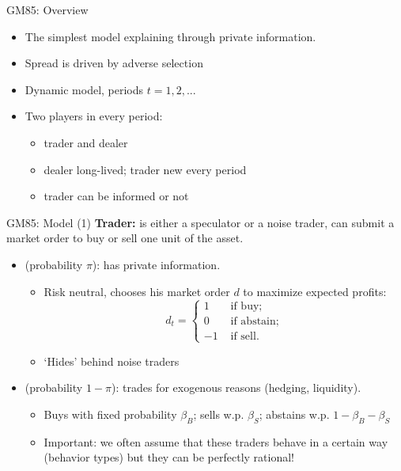 \documentclass[english,10pt
,aspectratio=169
]{beamer}
\begin{document}
\begin{frame}{GM85: Overview}
	\begin{itemize}
		\item The simplest model explaining  through private information.
		\item Spread is driven by adverse selection
		\item Dynamic model, periods $t = 1,2,...$
		\item Two players in every period:
		\begin{itemize}
			\item trader and dealer
			\item dealer long-lived; trader new every period
			\item trader can be informed or not
		\end{itemize}
	\end{itemize}
\end{frame}



\begin{frame}{GM85: Model (1)}
	\textbf{Trader:} is either a speculator or a noise trader, can submit a market order to buy or sell one unit of the asset.
	\begin{itemize}
		\item {} (probability $\pi$): has private information.
		\begin{itemize}
			\item Risk neutral, chooses his market order $d$ to maximize expected profits:
			\begin{equation*}
				d_t= \left\{
				\begin{aligned}
				1	& \text{ if buy}; \\
				0	& \text{ if abstain}; \\
				-1	& \text{ if sell}.
				\end{aligned}
				\right.
			\end{equation*}
			\item `Hides' behind noise traders
		\end{itemize}
		\item {} (probability $1-\pi$): trades for exogenous reasons (hedging, liquidity).
		\begin{itemize}
			\item Buys with fixed probability $\beta_B$; sells w.p. $\beta_S$; abstains w.p. $1-\beta_B - \beta_S$
			\item \alert{Important}: we often assume that these traders behave in a certain way (behavior types) but they can be perfectly rational!
		\end{itemize}
	\end{itemize}
\end{frame}
\end{document}
